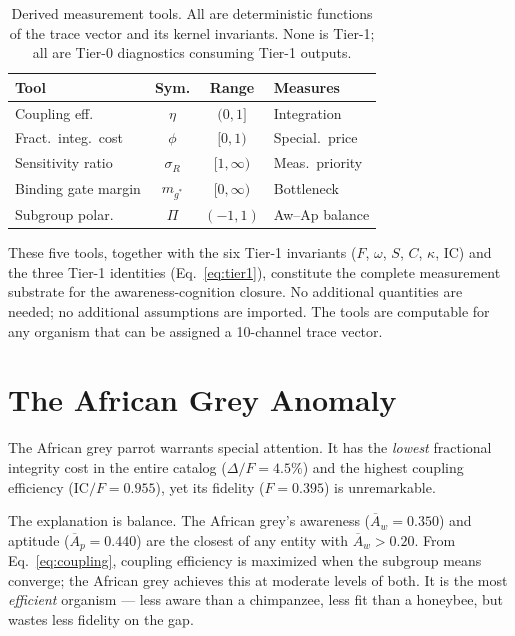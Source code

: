 \documentclass[
  aps,
  prd,
  twocolumn,
  superscriptaddress,
  nofootinbib,
  floatfix
]{revtex4-2}
\newcommand{\IC}{\mathrm{IC}}
\newcommand{\Aw}{\overline{A}_{\!w}}
\newcommand{\Ap}{\overline{A}_{\!p}}
\newcommand{\DeltaF}{\Delta\!/\!F}
\begin{document}
\begin{table}[h]
\caption{\label{tab:tools}Derived measurement tools.
All are deterministic functions of the trace vector and
its kernel invariants.  None is Tier-1; all are Tier-0
diagnostics consuming Tier-1 outputs.}
\small
\begin{ruledtabular}
\begin{tabular}{lccl}
Tool & Sym. & Range & Measures \\
\hline
Coupling eff. & $\eta$ & $(0,1]$ & Integration \\
Fract.\ integ.\ cost & $\phi$ & $[0,1)$ & Special.\ price \\
Sensitivity ratio & $\sigma_R$ & $[1,\infty)$ & Meas.\ priority \\
Binding gate margin & $m_{g^*}$ & $[0,\infty)$ & Bottleneck \\
Subgroup polar. & $\Pi$ & $(-1,1)$ & Aw--Ap balance \\
\end{tabular}
\end{ruledtabular}
\end{table}

These five tools, together with the six Tier-1 invariants
($F$, $\omega$, $S$, $C$, $\kappa$, $\IC$) and the three
Tier-1 identities (Eq.~\ref{eq:tier1}), constitute the
complete measurement substrate for the awareness-cognition
closure.  No additional quantities are needed; no
additional assumptions are imported.  The tools are
computable for any organism that can be assigned a
10-channel trace vector.

\section{The African Grey Anomaly}\label{sec:anomaly}

The African grey parrot warrants special attention.  It has
the \emph{lowest} fractional integrity cost in the entire
catalog ($\DeltaF = 4.5\%$) and the highest coupling
efficiency ($\IC/F = 0.955$), yet its fidelity ($F = 0.395$)
is unremarkable.

The explanation is balance.  The African grey's awareness
($\Aw = 0.350$) and aptitude ($\Ap = 0.440$) are the
closest of any entity with $\Aw > 0.20$.  From
Eq.~\ref{eq:coupling}, coupling efficiency is maximized when
the subgroup means converge; the African grey achieves this
at moderate levels of both.  It is the most \emph{efficient}
organism --- less aware than a chimpanzee, less fit than a
honeybee, but wastes less fidelity on the gap.
\end{document}
